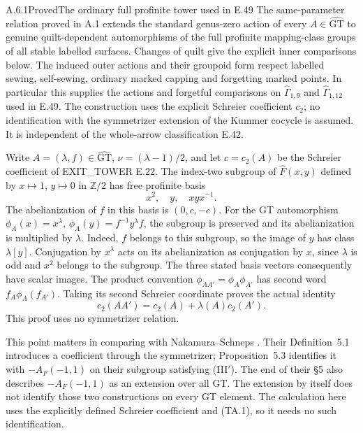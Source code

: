 \begin{result}{A.6.1}{Proved}{The ordinary full profinite tower used in E.49}
The same-parameter relation proved in A.1 extends the standard
genus-zero action of every $A\in\widehat{\mathrm{GT}}$ to genuine
quilt-dependent automorphisms of the full profinite mapping-class
groups of all stable labelled surfaces.  Changes of quilt give the
explicit inner comparisons below.  The induced outer actions and
their groupoid form respect labelled sewing, self-sewing, ordinary
marked capping and forgetting marked points.  In particular this
supplies the actions and forgetful comparisons on
$\widehat\Gamma_{1,9}$ and $\widehat\Gamma_{1,12}$ used in E.49.
The construction uses the explicit Schreier coefficient $c_2$;
no identification with the symmetrizer extension of the Kummer
cocycle is assumed.  It is independent of the whole-arrow
classification E.42.
\end{result}

Write $A=(\lambda,f)\in\widehat{\mathrm{GT}}$,
$\nu=(\lambda-1)/2$, and let $c=c_2(A)$ be the Schreier coefficient
of EXIT\_TOWER E.22.  The index-two subgroup of
$\widehat F(x,y)$ defined by $x\mapsto1$, $y\mapsto0$ in
$\mathbb Z/2$ has free profinite basis
\[
              x^2,\quad y,\quad xyx^{-1}.
\]
The abelianization of $f$ in this basis is $(0,c,-c)$.
For the GT automorphism
$\phi_A(x)=x^\lambda$,
$\phi_A(y)=f^{-1}y^\lambda f$, the subgroup is preserved and
its abelianization is multiplied by $\lambda$.  Indeed, $f$ belongs
to this subgroup, so the image of $y$ has class $\lambda[y]$.
Conjugation by $x^\lambda$ acts on its abelianization as conjugation
by $x$, since $\lambda$ is odd and $x^2$ belongs to the subgroup.
The three stated basis vectors consequently have scalar images.
The product convention $\phi_{AA'}=\phi_A\phi_{A'}$ has second
word $f_A\phi_A(f_{A'})$.  Taking its second Schreier coordinate
proves the actual identity
\[
 c_2(AA')=c_2(A)+\lambda(A)c_2(A').                 \tag{TA.1}
\]
This proof uses no symmetrizer relation.

This point matters in comparing with Nakamura--Schneps
\cite[Definition~5.1 and Proposition~5.3]{ET_NS2000}.
Their Definition~5.1 introduces a coefficient through the symmetrizer;
Proposition~5.3 identifies it with $-A_F(-1,1)$ on their subgroup
satisfying (III$'$).  The end of their \S5 also describes
$-A_F(-1,1)$ as an extension over all GT.  The extension by itself
does not identify those two constructions on every GT element.
The calculation here uses the explicitly defined Schreier coefficient
and (TA.1), so it needs no such identification.

